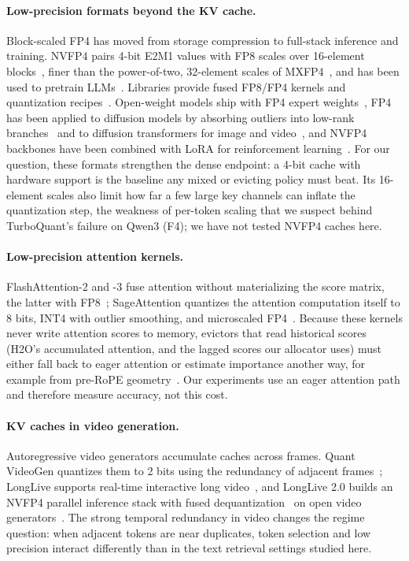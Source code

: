 \paragraph{Low-precision formats beyond the KV cache.}
Block-scaled FP4 has moved from storage compression to full-stack inference and
training.  NVFP4 pairs 4-bit E2M1 values with FP8 scales over 16-element
blocks~\citep{alvarez2025nvfp4,nvidia2025nvfp4ways}, finer than the
power-of-two, 32-element scales of MXFP4~\citep{ocp2023mx}, and has been used
to pretrain LLMs~\citep{nvidia2025nvfp4pretrain,devleker2025nvfp4train}.
Libraries provide fused FP8/FP4 kernels and quantization
recipes~\citep{nvidia2024te,nvidia2024modelopt}.  Open-weight models ship with
FP4 expert weights~\citep{openai2025gptoss,deepseek2026v4}, FP4 has been
applied to diffusion models by absorbing outliers into low-rank
branches~\citep{li2025svdquant} and to diffusion transformers for image and
video~\citep{zhao2024viditq}, and NVFP4 backbones have been combined with LoRA
for reinforcement learning~\citep{huang2025qerl}.  For our question, these
formats strengthen the dense endpoint: a 4-bit cache with hardware support is
the baseline any mixed or evicting policy must beat.  Its 16-element scales
also limit how far a few large key channels can inflate the quantization step,
the weakness of per-token scaling that we suspect behind TurboQuant's failure
on Qwen3 (F4); we have not tested NVFP4 caches here.

\paragraph{Low-precision attention kernels.}
FlashAttention-2 and -3 fuse attention without materializing the score
matrix, the latter with FP8~\citep{dao2023flashattention2,shah2024flashattention3};
SageAttention quantizes the attention computation itself to 8 bits, INT4 with
outlier smoothing, and microscaled FP4~\citep{zhang2024sageattention,zhang2024sageattention2,zhang2025sageattention3}.
Because these kernels never write attention scores to memory, evictors that
read historical scores (H2O's accumulated attention, and the lagged scores our
allocator uses) must either fall back to eager attention or estimate
importance another way, for example from pre-RoPE geometry~\citep{mao2026triattention}.
Our experiments use an eager attention path and therefore measure accuracy,
not this cost.

\paragraph{KV caches in video generation.}
Autoregressive video generators accumulate caches across frames.  Quant
VideoGen quantizes them to 2 bits using the redundancy of adjacent
frames~\citep{xi2026quantvideogen}; LongLive supports real-time interactive
long video~\citep{yang2026longlive}, and LongLive 2.0 builds an NVFP4 parallel
inference stack with fused dequantization~\citep{chen2026longlive2} on open
video generators~\citep{wan2025wan}.  The strong temporal redundancy in video
changes the regime question: when adjacent tokens are near duplicates, token
selection and low precision interact differently than in the text retrieval
settings studied here.
